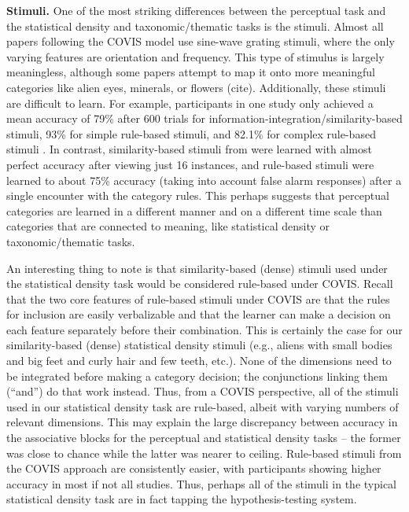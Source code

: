 \documentclass[../dissertation.tex]{subfiles}
\begin{document}
\textbf{Stimuli.} One of the most striking differences between the perceptual task and the statistical density and taxonomic/thematic tasks is the stimuli. Almost all papers following the COVIS model use sine-wave grating stimuli, where the only varying features are orientation and frequency. This type of stimulus is largely meaningless, although some papers attempt to map it onto more meaningful categories like alien eyes, minerals, or flowers (cite). Additionally, these stimuli are difficult to learn. For example, participants in one study only achieved a mean accuracy of 79\% after 600 trials for information-integration/similarity-based stimuli, 93\% for simple rule-based stimuli, and 82.1\% for complex rule-based stimuli \citep{Helie2010}. In contrast, similarity-based stimuli from \citet{Kloos2008} were learned with almost perfect accuracy after viewing just 16 instances, and rule-based stimuli were learned to about 75\% accuracy (taking into account false alarm responses) after a single encounter with the category rules. This perhaps suggests that perceptual categories are learned in a different manner and on a different time scale than categories that are connected to meaning, like statistical density or taxonomic/thematic tasks. \par
	An interesting thing to note is that similarity-based (dense) stimuli used under the statistical density task would be considered rule-based under COVIS. Recall that the two core features of rule-based stimuli under COVIS are that the rules for inclusion are easily verbalizable and that the learner can make a decision on each feature separately before their combination. This is certainly the case for our similarity-based (dense) statistical density stimuli (e.g., aliens with small bodies and big feet and curly hair and few teeth, etc.). None of the dimensions need to be integrated before making a category decision; the conjunctions linking them (“and”) do that work instead. Thus, from a COVIS perspective, all of the stimuli used in our statistical density task are rule-based, albeit with varying numbers of relevant dimensions. This may explain the large discrepancy between accuracy in the associative blocks for the perceptual and statistical density tasks – the former was close to chance while the latter was nearer to ceiling. Rule-based stimuli from the COVIS approach are consistently easier, with participants showing higher accuracy in most if not all studies. Thus, perhaps all of the stimuli in the typical statistical density task are in fact tapping the hypothesis-testing system. \par
\end{document}
